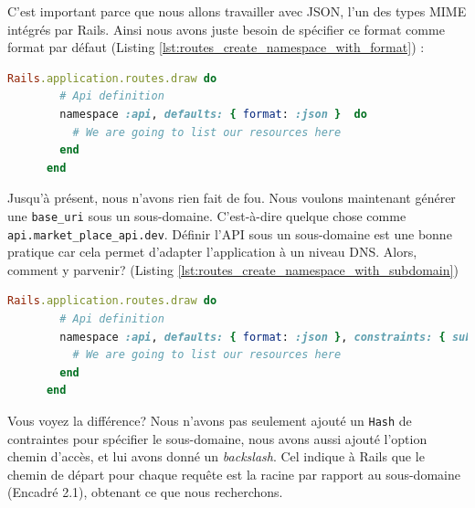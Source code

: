 \documentclass[]{report}
\begin{document}
      C'est important parce que nous allons travailler avec JSON, l'un des types MIME intégrés par Rails. Ainsi nous avons juste besoin de spécifier ce format comme format par défaut (Listing \ref{lst:routes_create_namespace_with_format}) :

      \begin{scriptsize}
      \begin{lstlisting}[language=ruby, caption={Création d'un Namespace avec un format par défault}, label={lst:routes_create_namespace_with_format}]
      Rails.application.routes.draw do
        # Api definition
        namespace :api, defaults: { format: :json }  do
          # We are going to list our resources here
        end
      end
      \end{lstlisting}
      \end{scriptsize}

      Jusqu'à présent, nous n'avons rien fait de fou. Nous voulons maintenant générer une \verb|base_uri| sous un sous-domaine. C'est-à-dire quelque chose comme \verb|api.market_place_api.dev|. Définir l'API sous un sous-domaine est une bonne pratique car cela permet d'adapter l'application à un niveau DNS. Alors, comment y parvenir? (Listing \ref{lst:routes_create_namespace_with_subdomain})

      \begin{scriptsize}
      \begin{lstlisting}[language=ruby, caption={Création d'un Namespace avec un format par défault}, label={lst:routes_create_namespace_with_subdomain}]
      Rails.application.routes.draw do
        # Api definition
        namespace :api, defaults: { format: :json }, constraints: { subdomain: 'api' }, path: '/'  do
          # We are going to list our resources here
        end
      end
      \end{lstlisting}
      \end{scriptsize}

      Vous voyez la différence? Nous n'avons pas seulement ajouté un \verb|Hash| de contraintes pour spécifier le sous-domaine, nous avons aussi ajouté l'option chemin d'accès, et lui avons donné un \textit{backslash}. Cel indique à Rails que le chemin de départ pour chaque requête est la racine par rapport au sous-domaine (Encadré 2.1), obtenant ce que nous recherchons.
\end{document}
